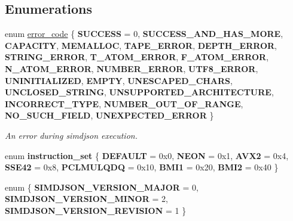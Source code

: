 \subsection*{Enumerations}
\begin{DoxyCompactItemize}
\item 
\mbox{\label{namespacesimdjson_a7b735a3a50ba79e3f7f14df5f77d8da9}} 
enum \hyperlink{namespacesimdjson_a7b735a3a50ba79e3f7f14df5f77d8da9}{error\+\_\+code} \{ \newline
{\bfseries S\+U\+C\+C\+E\+SS} = 0, 
{\bfseries S\+U\+C\+C\+E\+S\+S\+\_\+\+A\+N\+D\+\_\+\+H\+A\+S\+\_\+\+M\+O\+RE}, 
{\bfseries C\+A\+P\+A\+C\+I\+TY}, 
{\bfseries M\+E\+M\+A\+L\+L\+OC}, 
\newline
{\bfseries T\+A\+P\+E\+\_\+\+E\+R\+R\+OR}, 
{\bfseries D\+E\+P\+T\+H\+\_\+\+E\+R\+R\+OR}, 
{\bfseries S\+T\+R\+I\+N\+G\+\_\+\+E\+R\+R\+OR}, 
{\bfseries T\+\_\+\+A\+T\+O\+M\+\_\+\+E\+R\+R\+OR}, 
\newline
{\bfseries F\+\_\+\+A\+T\+O\+M\+\_\+\+E\+R\+R\+OR}, 
{\bfseries N\+\_\+\+A\+T\+O\+M\+\_\+\+E\+R\+R\+OR}, 
{\bfseries N\+U\+M\+B\+E\+R\+\_\+\+E\+R\+R\+OR}, 
{\bfseries U\+T\+F8\+\_\+\+E\+R\+R\+OR}, 
\newline
{\bfseries U\+N\+I\+N\+I\+T\+I\+A\+L\+I\+Z\+ED}, 
{\bfseries E\+M\+P\+TY}, 
{\bfseries U\+N\+E\+S\+C\+A\+P\+E\+D\+\_\+\+C\+H\+A\+RS}, 
{\bfseries U\+N\+C\+L\+O\+S\+E\+D\+\_\+\+S\+T\+R\+I\+NG}, 
\newline
{\bfseries U\+N\+S\+U\+P\+P\+O\+R\+T\+E\+D\+\_\+\+A\+R\+C\+H\+I\+T\+E\+C\+T\+U\+RE}, 
{\bfseries I\+N\+C\+O\+R\+R\+E\+C\+T\+\_\+\+T\+Y\+PE}, 
{\bfseries N\+U\+M\+B\+E\+R\+\_\+\+O\+U\+T\+\_\+\+O\+F\+\_\+\+R\+A\+N\+GE}, 
{\bfseries N\+O\+\_\+\+S\+U\+C\+H\+\_\+\+F\+I\+E\+LD}, 
\newline
{\bfseries U\+N\+E\+X\+P\+E\+C\+T\+E\+D\+\_\+\+E\+R\+R\+OR}
 \}\begin{DoxyCompactList}\small\item\em An error during simdjson execution. \end{DoxyCompactList}
\item 
\mbox{\label{namespacesimdjson_a3dec9ca9f787d4ff401f5ecd193c8377}} 
enum {\bfseries instruction\+\_\+set} \{ \newline
{\bfseries D\+E\+F\+A\+U\+LT} = 0x0, 
{\bfseries N\+E\+ON} = 0x1, 
{\bfseries A\+V\+X2} = 0x4, 
{\bfseries S\+S\+E42} = 0x8, 
\newline
{\bfseries P\+C\+L\+M\+U\+L\+Q\+DQ} = 0x10, 
{\bfseries B\+M\+I1} = 0x20, 
{\bfseries B\+M\+I2} = 0x40
 \}
\item 
\mbox{\label{namespacesimdjson_aa58d4d431990fa658c5a1385ea1e641b}} 
enum \{ {\bfseries S\+I\+M\+D\+J\+S\+O\+N\+\_\+\+V\+E\+R\+S\+I\+O\+N\+\_\+\+M\+A\+J\+OR} = 0, 
{\bfseries S\+I\+M\+D\+J\+S\+O\+N\+\_\+\+V\+E\+R\+S\+I\+O\+N\+\_\+\+M\+I\+N\+OR} = 2, 
{\bfseries S\+I\+M\+D\+J\+S\+O\+N\+\_\+\+V\+E\+R\+S\+I\+O\+N\+\_\+\+R\+E\+V\+I\+S\+I\+ON} = 1
 \}
\end{DoxyCompactItemize}
